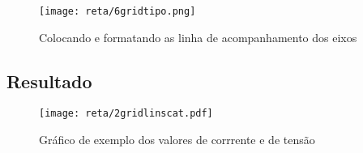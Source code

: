     \begin{figure}[htbp]
        \centering
        \texttt{[image: reta/6gridtipo.png]}

        \caption{Colocando e formatando as linha de acompanhamento dos eixos}
        \label{fig:reta:gridtipo}
    \end{figure}


\subsection{Resultado}

    \begin{figure}[htbp]
        \centering
        \texttt{[image: reta/2gridlinscat.pdf]}

        \caption{Gráfico de exemplo dos valores de corrrente e de tensão}
        \label{fig:reta:gridlinscat}
    \end{figure}

